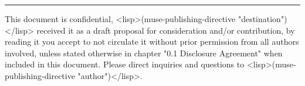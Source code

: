 
\vspace{.5cm}\hrule\vspace{.5cm}

This   document   is  confidential,   <lisp>(muse-publishing-directive
"destination")</lisp>   received   it   as   a  draft   proposal   for
consideration  and/or contribution, by  reading it  you accept  to not
circulate  it  without prior  permission  from  all authors  involved,
unless  stated otherwise  in chapter  "0.1 Disclosure  Agreement" when
included in  this document.  Please direct inquiries  and questions to
<lisp>(muse-publishing-directive "author")</lisp>.


